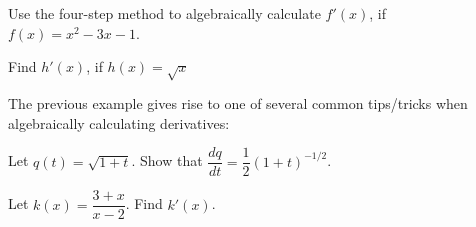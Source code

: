 \documentclass[notes]{subfiles}
\begin{document}
		\begin{rmk}
		\end{rmk}
			\newpage
			
		\begin{ex}
			Use the four-step method to algebraically calculate $f'(x)$, if $f(x) = x^2 - 3x -1$.
		\end{ex}
			
		\begin{ex}
			Find $h'(x)$, if $h(x) = \sqrt{x}$
		\end{ex}
			
		The previous example gives rise to one of several common tips/tricks when algebraically calculating derivatives:
			\newpage
			
		\begin{ex}
			Let $q(t) = \sqrt{1+t}$.  Show that $\dfrac{dq}{dt} = \dfrac{1}{2}(1+t)^{-1/2}$.
		\end{ex}
			
		\begin{ex}
			Let $k(x) = \dfrac{3+x}{x-2}$.  Find $k'(x)$.
		\end{ex}
			
\end{document}
